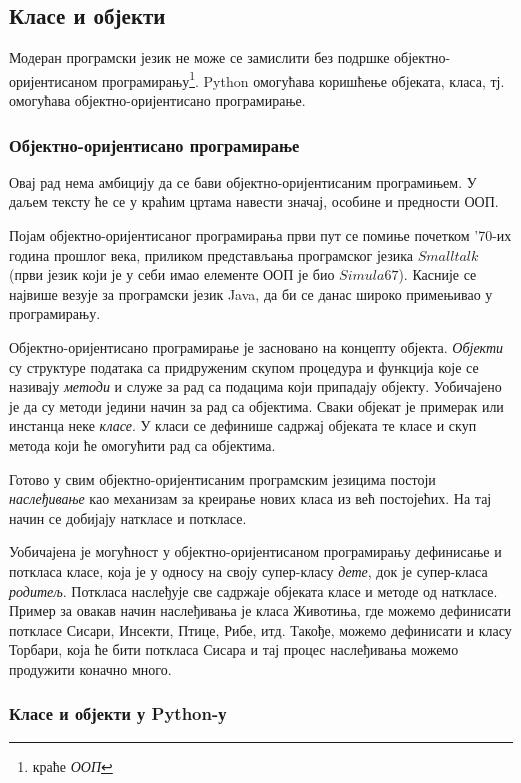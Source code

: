\subsection{Класе и објекти}

Модеран програмски језик не може се замислити без подршке објектно-оријентисаном програмирању\footnote{краће \emph{ООП}}. Python омогућава коришћење објеката, класа, тј. омогућава објектно-оријентисано програмирање.

\subsubsection{Објектно-оријентисано програмирање}

Овај рад нема амбицију да се бави објектно-оријентисаним програмињем. У даљем тексту ће се у краћим цртама навести значај, особине и предности ООП.

Појам објектно-оријентисаног програмирања први пут се помиње почетком '70-их година прошлог века, приликом представљања програмског језика $Smalltalk$ (први језик који је у себи имао елементе ООП је био $Simula67$). Касније се највише везује за програмски језик Java, да би се данас широко примењивао у програмирању.

Објектно-оријентисано програмирање је засновано на концепту објекта. \emph{Објекти} су структуре података са придруженим скупом процедура и функција које се називају \emph{методи} и служе за рад са подацима који припадају објекту. Уобичајено је да су методи једини начин за рад са објектима. Сваки објекат је примерак или инстанца неке \emph{класе}. У класи се дефинише садржај објеката те класе и скуп метода који ће омогућити рад са објектима.

Готово у свим објектно-оријентисаним програмским језицима постоји \emph{наслеђивање} као механизам за креирање нових класа из већ постојећих. На тај начин се добијају наткласе и поткласе.

Уобичајена је могућност у објектно-оријентисаном програмирању дефинисање и поткласа класе, која је у односу на своју супер-класу \emph{дете}, док је супер-класа \emph{родитељ}. Поткласа наслеђује све садржаје објеката класе и методе од наткласе. Пример за овакав начин наслеђивања је класа Животиња, где можемо дефинисати поткласе Сисари, Инсекти, Птице, Рибе, итд. Такође, можемо дефинисати и класу Торбари, која ће бити поткласа Сисара и тај процес наслеђивања можемо продужити коначно много.

\subsubsection{Класе и објекти у Python-у}

